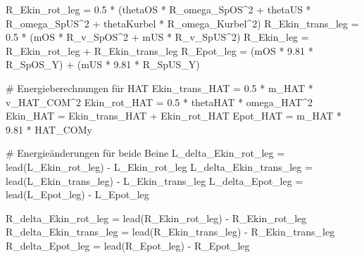 \documentclass[
  letterpaper,
  DIV=11]{scrartcl}
\newenvironment{Shaded}{\begin{snugshade}}{\end{snugshade}}
\newcommand{\CommentTok}[1]{\textcolor[rgb]{0.37,0.37,0.37}{#1}}
\newcommand{\DecValTok}[1]{\textcolor[rgb]{0.68,0.00,0.00}{#1}}
\newcommand{\FloatTok}[1]{\textcolor[rgb]{0.68,0.00,0.00}{#1}}
\newcommand{\FunctionTok}[1]{\textcolor[rgb]{0.28,0.35,0.67}{#1}}
\newcommand{\NormalTok}[1]{\textcolor[rgb]{0.00,0.23,0.31}{#1}}
\newcommand{\OtherTok}[1]{\textcolor[rgb]{0.00,0.23,0.31}{#1}}
\newcommand{\SpecialCharTok}[1]{\textcolor[rgb]{0.37,0.37,0.37}{#1}}
\begin{document}
\begin{Shaded}
\begin{Highlighting}[]
\NormalTok{R\_Ekin\_rot\_leg }\OtherTok{=} \FloatTok{0.5} \SpecialCharTok{*}\NormalTok{ (thetaOS }\SpecialCharTok{*}\NormalTok{ R\_omega\_SpOS}\SpecialCharTok{\^{}}\DecValTok{2} \SpecialCharTok{+}\NormalTok{ thetaUS }\SpecialCharTok{*}\NormalTok{ R\_omega\_SpUS}\SpecialCharTok{\^{}}\DecValTok{2} \SpecialCharTok{+}\NormalTok{ thetaKurbel }\SpecialCharTok{*}\NormalTok{ R\_omega\_Kurbel}\SpecialCharTok{\^{}}\DecValTok{2}\NormalTok{)}
\NormalTok{R\_Ekin\_trans\_leg }\OtherTok{=} \FloatTok{0.5} \SpecialCharTok{*}\NormalTok{ (mOS }\SpecialCharTok{*}\NormalTok{ R\_v\_SpOS}\SpecialCharTok{\^{}}\DecValTok{2} \SpecialCharTok{+}\NormalTok{ mUS }\SpecialCharTok{*}\NormalTok{ R\_v\_SpUS}\SpecialCharTok{\^{}}\DecValTok{2}\NormalTok{)}
\NormalTok{R\_Ekin\_leg }\OtherTok{=}\NormalTok{ R\_Ekin\_rot\_leg }\SpecialCharTok{+}\NormalTok{ R\_Ekin\_trans\_leg}
\NormalTok{R\_Epot\_leg }\OtherTok{=}\NormalTok{ (mOS }\SpecialCharTok{*} \FloatTok{9.81} \SpecialCharTok{*}\NormalTok{ R\_SpOS\_Y) }\SpecialCharTok{+}\NormalTok{ (mUS }\SpecialCharTok{*} \FloatTok{9.81} \SpecialCharTok{*}\NormalTok{ R\_SpUS\_Y)}

\CommentTok{\# Energieberechnungen für HAT}
\NormalTok{Ekin\_trans\_HAT }\OtherTok{=} \FloatTok{0.5} \SpecialCharTok{*}\NormalTok{ m\_HAT }\SpecialCharTok{*}\NormalTok{ v\_HAT\_COM}\SpecialCharTok{\^{}}\DecValTok{2}
\NormalTok{Ekin\_rot\_HAT }\OtherTok{=} \FloatTok{0.5} \SpecialCharTok{*}\NormalTok{ thetaHAT }\SpecialCharTok{*}\NormalTok{ omega\_HAT}\SpecialCharTok{\^{}}\DecValTok{2}
\NormalTok{Ekin\_HAT }\OtherTok{=}\NormalTok{ Ekin\_trans\_HAT }\SpecialCharTok{+}\NormalTok{ Ekin\_rot\_HAT}
\NormalTok{Epot\_HAT }\OtherTok{=}\NormalTok{ m\_HAT }\SpecialCharTok{*} \FloatTok{9.81} \SpecialCharTok{*}\NormalTok{ HAT\_COMy}

\CommentTok{\# Energieänderungen für beide Beine}
\NormalTok{L\_delta\_Ekin\_rot\_leg }\OtherTok{=} \FunctionTok{lead}\NormalTok{(L\_Ekin\_rot\_leg) }\SpecialCharTok{{-}}\NormalTok{ L\_Ekin\_rot\_leg}
\NormalTok{L\_delta\_Ekin\_trans\_leg }\OtherTok{=} \FunctionTok{lead}\NormalTok{(L\_Ekin\_trans\_leg) }\SpecialCharTok{{-}}\NormalTok{ L\_Ekin\_trans\_leg}
\NormalTok{L\_delta\_Epot\_leg }\OtherTok{=} \FunctionTok{lead}\NormalTok{(L\_Epot\_leg) }\SpecialCharTok{{-}}\NormalTok{ L\_Epot\_leg}

\NormalTok{R\_delta\_Ekin\_rot\_leg }\OtherTok{=} \FunctionTok{lead}\NormalTok{(R\_Ekin\_rot\_leg) }\SpecialCharTok{{-}}\NormalTok{ R\_Ekin\_rot\_leg}
\NormalTok{R\_delta\_Ekin\_trans\_leg }\OtherTok{=} \FunctionTok{lead}\NormalTok{(R\_Ekin\_trans\_leg) }\SpecialCharTok{{-}}\NormalTok{ R\_Ekin\_trans\_leg}
\NormalTok{R\_delta\_Epot\_leg }\OtherTok{=} \FunctionTok{lead}\NormalTok{(R\_Epot\_leg) }\SpecialCharTok{{-}}\NormalTok{ R\_Epot\_leg}


\end{Highlighting}
\end{Shaded}
\end{document}
